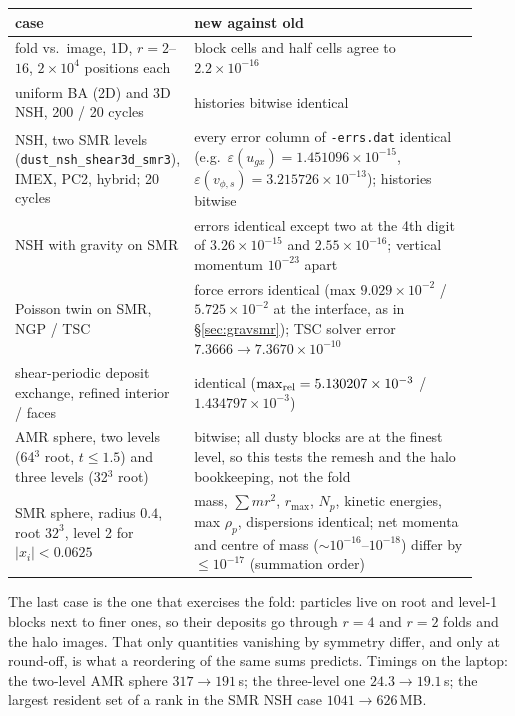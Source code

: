 \documentclass[11pt]{article}
\newcommand{\code}[1]{\texttt{#1}}
\newcommand{\file}[1]{\texttt{#1}}
\begin{document}
\begin{center}\small
\begin{tabular}{p{0.30\linewidth}p{0.62\linewidth}}
\toprule
case & new against old \\
\midrule
fold vs.\ image, 1D, $r = 2$--$16$, $2\times10^4$ positions each & block cells and half
  cells agree to $2.2\times10^{-16}$ \\
uniform BA (2D) and 3D NSH, 200 / 20 cycles & histories bitwise identical \\
NSH, two SMR levels (\code{dust\_nsh\_shear3d\_smr3}), IMEX, PC2, hybrid; 20 cycles & every
  error column of \file{-errs.dat} identical (e.g.\ $\varepsilon(u_{gx}) = 1.451096\times10^{-15}$,
  $\varepsilon(v_{\phi,s}) = 3.215726\times10^{-13}$); histories bitwise \\
NSH with gravity on SMR & errors identical except two at the 4th digit of
  $3.26\times10^{-15}$ and $2.55\times10^{-16}$; vertical momentum $10^{-23}$ apart \\
Poisson twin on SMR, NGP / TSC & force errors identical (max $9.029\times10^{-2}$ /
  $5.725\times10^{-2}$ at the interface, as in \S\ref{sec:gravsmr}); TSC solver
  error $7.3666\to7.3670\times10^{-10}$ \\
shear-periodic deposit exchange, refined interior / faces & identical
  ($\max_{\rm rel} = 5.130207\times10^{-3}$ / $1.434797\times10^{-3}$) \\
AMR sphere, two levels (64$^3$ root, $t \le 1.5$) and three levels (32$^3$ root) &
  bitwise; all dusty blocks are at the finest level, so this tests the remesh and the halo
  bookkeeping, not the fold \\
SMR sphere, radius $0.4$, root $32^3$, level 2 for $|x_i| < 0.0625$ & mass, $\sum m r^2$,
  $r_{\max}$, $N_p$, kinetic energies, max $\rho_p$, dispersions identical; net momenta and
  centre of mass ($\sim10^{-16}$--$10^{-18}$) differ by $\le 10^{-17}$ (summation order) \\
\bottomrule
\end{tabular}
\end{center}

The last case is the one that exercises the fold: particles live on root and level-1
blocks next to finer ones, so their deposits go through $r = 4$ and $r = 2$ folds and the
halo images. That only quantities vanishing by symmetry differ, and only at round-off, is
what a reordering of the same sums predicts. Timings on the laptop: the two-level AMR
sphere $317 \to 191$\,s; the three-level one $24.3 \to 19.1$\,s; the largest resident set of
a rank in the SMR NSH case $1041 \to 626$\,MB.
\end{document}

